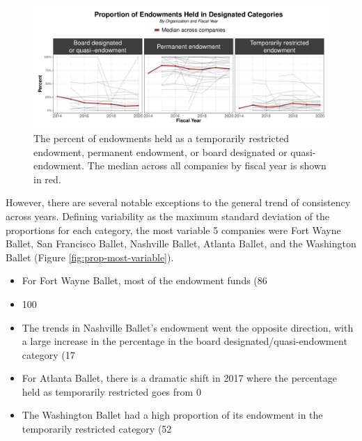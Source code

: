 \documentclass[Dance Data
Project,article,submit,moreauthors,pdftex]{mdpi}
\begin{document}
\begin{figure}[H]
\includegraphics[width=0.9\linewidth,]{../images/proportion_endowment_categories} \caption{\label{fig:endowment-type}The percent of endowments held as a temporarily restricted endowment, permanent endowment, or board designated or quasi-endowment. The median across all companies by fiscal year is shown in red.}\label{fig:proportion-endowment-categories}
\end{figure}

However, there are several notable exceptions to the general trend of
consistency across years. Defining variability as the maximum standard
deviation of the proportions for each category, the most variable 5
companies were Fort Wayne Ballet, San Francisco Ballet, Nashville
Ballet, Atlanta Ballet, and the Washington Ballet (Figure
\ref{fig:prop-most-variable}).

\begin{itemize}
\item For Fort Wayne Ballet, most of the endowment funds (86%
\item 100%
\item  The trends in Nashville Ballet’s endowment went the opposite direction, with a large increase in the percentage in the  board designated/quasi-endowment  category (17%
\item For Atlanta Ballet, there is a dramatic shift in 2017 where the percentage held as temporarily restricted goes from 0%
\item The Washington Ballet had a high proportion of its endowment in the temporarily restricted category (52%
\end{itemize}
\end{document}
